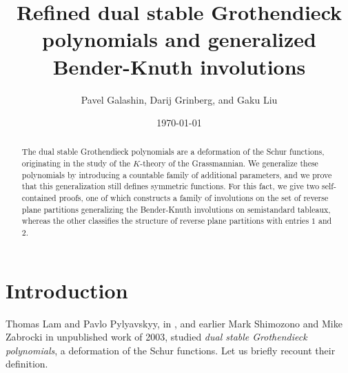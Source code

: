 \documentclass[numbers=enddot,12pt,final,onecolumn,notitlepage]{scrartcl}%
\theoremstyle{definition}
\begin{document}
\title{Refined dual stable Grothendieck polynomials and generalized Bender-Knuth involutions}
\author{Pavel Galashin, Darij Grinberg, and Gaku Liu}
\date{\today}
\maketitle

\begin{abstract}
The dual stable Grothendieck polynomials are a deformation of
the Schur functions, originating in the study of the $K$-theory of the
Grassmannian. We generalize these polynomials by introducing a
countable family of additional parameters, and we prove that this
generalization still defines symmetric functions. For this fact, we
give two self-contained proofs, one of which constructs a family of
involutions on the set of reverse plane partitions generalizing the
Bender-Knuth involutions on semistandard tableaux, whereas the other
classifies the structure of reverse plane partitions with entries $1$
and $2$.
\end{abstract}

\section{Introduction}

Thomas Lam and Pavlo Pylyavskyy, in \cite[\S 9.1]{LamPyl}, and earlier Mark
Shimozono and Mike Zabrocki in unpublished work of 2003, studied \textit{dual
stable Grothendieck polynomials}, a deformation of the Schur
functions. Let us briefly recount their definition.
\begin{comment}
 
\footnote{All definitions
that will be made in this introduction are provisional. Every notion that will
be used in the paper is going to be defined in more detail and precision in
one of the sections below; thus, a reader not already familiar with Schur
functions and partitions should start reading from Section
\ref{sect.notations} on.}

\end{comment}
\end{document}
